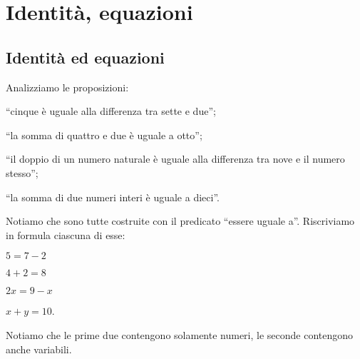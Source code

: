 


\chapter{Identità, equazioni}


\section{Identità ed equazioni}
\label{sec:eq1_definizioni}

Analizziamo le proposizioni:

\begin{enumeratea}
\item ``cinque è uguale alla differenza tra sette e due'';
\item ``la somma di quattro e due è uguale a otto'';
\item ``il doppio di un numero naturale è uguale alla differenza tra nove e il 
numero stesso'';
\item ``la somma di due numeri interi è uguale a dieci''.
\end{enumeratea}

Notiamo che sono tutte costruite con il predicato
``essere uguale a''. Riscriviamo in formula ciascuna di esse:
\begin{htmulticols}{4}
\begin{enumeratea}
\item \(5=7-2\)
\item \(4+2=8\)
\item \(2x=9-x\)
\item \(x+y=10\).
\end{enumeratea}
\end{htmulticols}
Notiamo che le prime due contengono solamente numeri, le seconde
contengono anche variabili.

